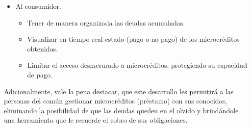 {\begin{itemize}
	\item Al consumidor.
	\begin{itemize}
		\item Tener de manera organizada las deudas acumuladas.
		\item Visualizar en tiempo real estado (pago o no pago) de los microcréditos obtenidos.
		\item Limitar el acceso desmesurado a microcréditos, protegiendo su capacidad de pago.
	\end{itemize}

\end{itemize}

Adicionalmente, vale la pena destacar, que este desarrollo les permitirá a las personas del común gestionar microcréditos (préstamo) con sus conocidos, eliminando la posibilidad de que las deudas queden en el olvido y brindándole una herramienta que le recuerde el cobro de sus obligaciones.}
